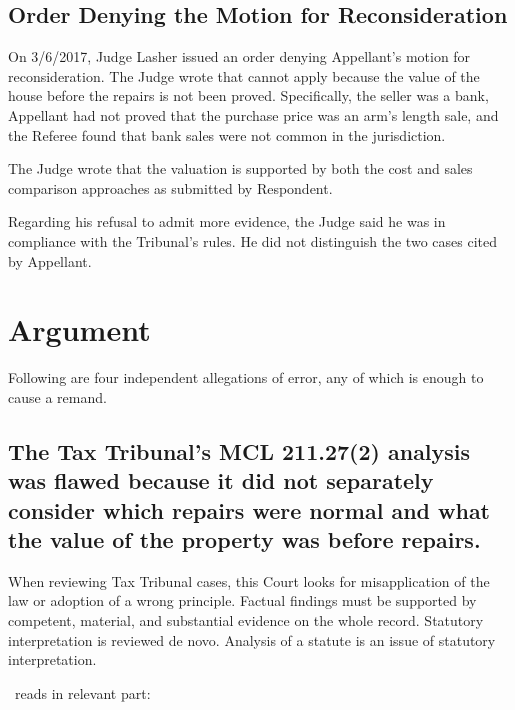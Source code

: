 \documentclass[12pt,\documentclassflag]{michiganCourtOfAppealsBrief}
\def\mathieuGast{\pincite[l]{MCL}{211.27(2)}}
\begin{document}
\subsection{Order Denying the Motion for Reconsideration}

On 3/6/2017, Judge Lasher issued an order denying Appellant's motion for reconsideration. The Judge wrote that  cannot apply because the value of the house before the repairs is not been proved. Specifically, the seller was a bank, Appellant had not proved that the purchase price was an arm's length sale, and the Referee found that bank sales were not common in the jurisdiction. 

The Judge wrote that the valuation is supported by both the cost and sales comparison approaches as submitted by Respondent. 

Regarding his refusal to admit more evidence, the Judge said he was in compliance with the Tribunal's rules. He did not distinguish the two cases cited by Appellant. 

\section{Argument}

Following are four independent allegations of error, any of which is enough to cause a remand. 


\subsection{The Tax Tribunal's MCL 211.27(2) analysis was flawed because it did not separately consider which repairs were normal and what the value of the property was before repairs.} \label{incoherent}

When reviewing Tax Tribunal cases, this Court looks for misapplication of the law or adoption of a wrong principle. Factual findings must be supported by competent, material, and substantial evidence on the whole record. Statutory interpretation is reviewed de novo.  Analysis of a statute is an issue of statutory interpretation.

\mathieuGast\ reads in relevant part:
\end{document}
